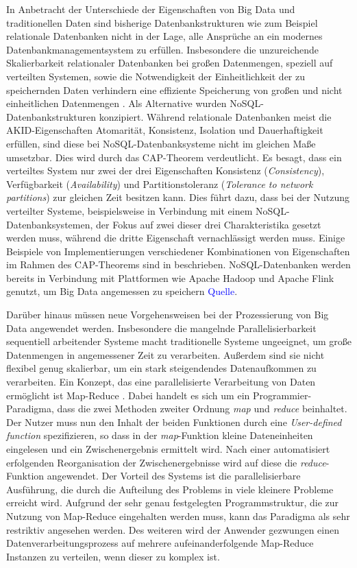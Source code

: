 In Anbetracht der Unterschiede der Eigenschaften von Big Data und traditionellen Daten sind bisherige Datenbankstrukturen wie zum Beispiel relationale Datenbanken nicht in der Lage, alle Ansprüche an ein modernes Datenbankmanagementsystem zu erfüllen. Insbesondere die unzureichende Skalierbarkeit relationaler Datenbanken bei großen Datenmengen, speziell auf verteilten Systemen, sowie die Notwendigkeit der Einheitlichkeit der zu speichernden Daten verhindern eine effiziente Speicherung von großen und nicht einheitlichen Datenmengen \cite{Moniruzzaman2013}. Als Alternative wurden NoSQL-Datenbankstrukturen konzipiert. Während relationale Datenbanken meist die AKID-Eigenschaften Atomarität, Konsistenz, Isolation und Dauerhaftigkeit \cite{Haerder1983} erfüllen, sind diese bei NoSQL-Datenbanksysteme nicht im gleichen Maße umsetzbar. Dies wird durch das CAP-Theorem \cite{Brewer2000} verdeutlicht. Es besagt, dass ein verteiltes System nur zwei der drei Eigenschaften Konsistenz (\textit{Consistency}), Verfügbarkeit (\textit{Availability}) und Partitionstoleranz (\textit{Tolerance to network partitions}) zur gleichen Zeit besitzen kann. Dies führt dazu, dass bei der Nutzung verteilter Systeme, beispielsweise in Verbindung mit einem NoSQL-Datenbanksystemen, der Fokus auf zwei dieser drei Charakteristika gesetzt werden muss, während die dritte Eigenschaft vernachlässigt werden muss. Einige Beispiele von Implementierungen verschiedener Kombinationen von Eigenschaften im Rahmen des CAP-Theorems sind in \cite{Abadi2009} beschrieben. NoSQL-Datenbanken werden bereits in Verbindung mit Plattformen wie Apache Hadoop \cite{HadoopWebsite} und Apache Flink \cite{FlinkWebsite} genutzt, um Big Data angemessen zu speichern \textcolor{blue}{Quelle}.

Darüber hinaus müssen neue Vorgehensweisen bei der Prozessierung von Big Data angewendet werden. Insbesondere die mangelnde Parallelisierbarkeit sequentiell arbeitender Systeme macht traditionelle Systeme ungeeignet, um große Datenmengen in angemessener Zeit zu verarbeiten. Außerdem sind sie nicht flexibel genug skalierbar, um ein stark steigendendes Datenaufkommen zu verarbeiten. Ein Konzept, das eine parallelisierte Verarbeitung von Daten ermöglicht ist Map-Reduce \cite{Dean2004}. Dabei handelt es sich um ein Programmier-Paradigma, dass die zwei Methoden zweiter Ordnung \textit{map} und \textit{reduce} beinhaltet. Der Nutzer muss nun den Inhalt der beiden Funktionen durch eine \textit{User-defined function} spezifizieren, so dass in der \textit{map}-Funktion kleine Dateneinheiten eingelesen und ein Zwischenergebnis ermittelt wird. Nach einer automatisiert erfolgenden Reorganisation der Zwischenergebnisse wird auf diese die \textit{reduce}-Funktion angewendet. Der Vorteil des Systems ist die parallelisierbare Ausführung, die durch die Aufteilung des Problems in viele kleinere Probleme erreicht wird. Aufgrund der sehr genau festgelegten Programmstruktur, die zur Nutzung von Map-Reduce eingehalten werden muss, kann das Paradigma als sehr restriktiv angesehen werden. Des weiteren wird der Anwender gezwungen einen Datenverarbeitungsprozess auf mehrere aufeinanderfolgende Map-Reduce Instanzen zu verteilen, wenn dieser zu komplex ist. 

